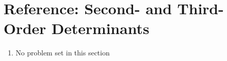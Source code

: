 \section{Reference: Second- and Third-Order Determinants}

\begin{enumerate}
    \item No problem set in this section
\end{enumerate}